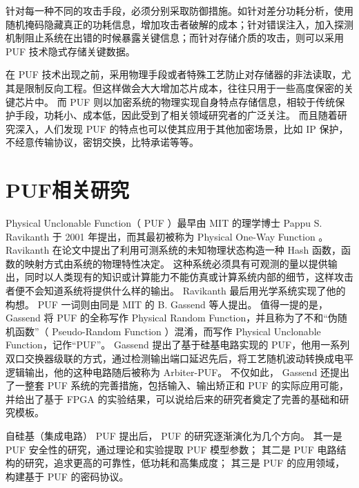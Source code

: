 针对每一种不同的攻击手段，必须分别采取防御措施。如针对差分功耗分析，使用随机掩码隐藏真正的功耗信息，增加攻击者破解的成本\supercite{rivain2010provably}；针对错误注入，加入探测机制阻止系统在出错的时候暴露关键信息\supercite{karaklajic2013hardware}；而针对存储介质的攻击，则可以采用 PUF 技术隐式存储关键数据。

在 PUF 技术出现之前，采用物理手段或者特殊工艺防止对存储器的非法读取，尤其是限制反向工程。但这样做会大大增加芯片成本，往往只用于一些高度保密的关键芯片中。
而 PUF 则以加密系统的物理实现自身特点存储信息，相较于传统保护手段，功耗小、成本低，因此受到了相关领域研究者的广泛关注。
而且随着研究深入，人们发现 PUF 的特点也可以使其应用于其他加密场景，比如 IP 保护\supercite{Guajardo2007fpga}\supercite{kumar2008butterfly}，不经意传输协议\supercite{ruhrmair2010oblivious}，密钥交换\supercite{rostami2014robust}，比特承诺\supercite{ruhrmair2012practical}等等。

\section{PUF相关研究}\label{sec:PUF-research}
Physical Unclonable Function（ PUF ）最早由 MIT 的理学博士 Pappu S. Ravikanth 于 2001 年提出\supercite{pappu2002physical}，而其最初被称为 Physical One-Way Function 。
Ravikanth 在论文中提出了利用可测系统的未知物理状态构造一种 Hash 函数，函数的映射方式由系统的物理特性决定。
这种系统必须具有可观测的量以提供输出，同时以人类现有的知识或计算能力不能仿真或计算系统内部的细节，这样攻击者便不会知道系统将提供什么样的输出。
Ravikanth 最后用光学系统实现了他的构想。
PUF 一词则由同是 MIT 的 B. Gassend 等人提出\supercite{gassend2002silicon}。
值得一提的是， Gassend 将 PUF 的全称写作 Physical Random Function，并且称为了不和``伪随机函数''（ Pseudo-Random Function ）混淆，而写作 Physical Unclonable Function，记作``PUF''。
Gassend 提出了基于硅基电路实现的 PUF，他用一系列双口交换器级联的方式，通过检测输出端口延迟先后，将工艺随机波动转换成电平逻辑输出，他的这种电路随后被称为 Arbiter-PUF。
不仅如此， Gassend 还提出了一整套 PUF 系统的完善措施，包括输入、输出矫正和 PUF 的实际应用可能，并给出了基于 FPGA 的实验结果，可以说给后来的研究者奠定了完善的基础和研究模板。

自硅基（集成电路） PUF 提出后， PUF 的研究逐渐演化为几个方向。
其一是 PUF 安全性的研究，通过理论和实验提取 PUF 模型参数；
其二是 PUF 电路结构的研究，追求更高的可靠性，低功耗和高集成度；
其三是 PUF 的应用领域，构建基于 PUF 的密码协议。

